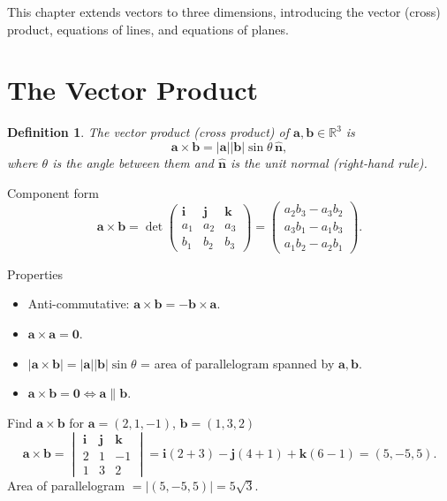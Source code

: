 \documentclass[12pt,a4paper]{article}
\theoremstyle{defstyle}
\newtheorem{definition}{Definition}[section]
\newcommand{\R}{\mathbb{R}}
\begin{document}
This chapter extends vectors to three dimensions, introducing the vector (cross) product, equations of lines, and equations of planes.

\section{The Vector Product}

\begin{definition}
The \emph{vector product} (cross product) of \(\mathbf{a},\mathbf{b}\in\R^3\) is
\[
  \mathbf{a}\times\mathbf{b} = |\mathbf{a}||\mathbf{b}|\sin\theta\,\hat{\mathbf{n}},
\]
where \(\theta\) is the angle between them and \(\hat{\mathbf{n}}\) is the unit normal (right-hand rule).
\end{definition}

\begin{result}{Component form}{}
\[
  \mathbf{a}\times\mathbf{b}
  = \det\begin{pmatrix}\mathbf{i}&\mathbf{j}&\mathbf{k}\\a_1&a_2&a_3\\b_1&b_2&b_3\end{pmatrix}
  = \begin{pmatrix}a_2b_3-a_3b_2\\ a_3b_1-a_1b_3\\ a_1b_2-a_2b_1\end{pmatrix}.
\]
\end{result}

\begin{result}{Properties}{}
\begin{itemize}[nosep]
  \item Anti-commutative: \(\mathbf{a}\times\mathbf{b}=-\mathbf{b}\times\mathbf{a}\).
  \item \(\mathbf{a}\times\mathbf{a}=\mathbf{0}\).
  \item \(|\mathbf{a}\times\mathbf{b}|=|\mathbf{a}||\mathbf{b}|\sin\theta\) = area of parallelogram spanned by \(\mathbf{a},\mathbf{b}\).
  \item \(\mathbf{a}\times\mathbf{b}=\mathbf{0}\iff\mathbf{a}\parallel\mathbf{b}\).
\end{itemize}
\end{result}

\begin{example}{Find $\mathbf{a}\times\mathbf{b}$ for $\mathbf{a}=(2,1,-1)$, $\mathbf{b}=(1,3,2)$}{}
\[
  \mathbf{a}\times\mathbf{b}=\begin{vmatrix}\mathbf{i}&\mathbf{j}&\mathbf{k}\\2&1&-1\\1&3&2\end{vmatrix}
  = \mathbf{i}(2+3)-\mathbf{j}(4+1)+\mathbf{k}(6-1)
  = (5,-5,5).
\]
Area of parallelogram \(= |(5,-5,5)| = 5\sqrt{3}\).
\end{example}
\end{document}

